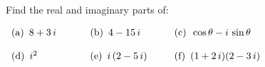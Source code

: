 Find the real and imaginary parts of:

$
\begin{array}[h!]{lll}
{\rm (a)}\hskip5pt 8+3\,i\hskip24pt&
{\rm (b)}\hskip5pt 4-15\,i\hskip24pt&
{\rm (c)}\hskip5pt \cos\theta-i\,\sin\theta\\
\noalign{\vskip12pt}
{\rm (d)}\hskip5pt i^2&
{\rm (e)}\hskip5pt i\,(2-5\,i)&
{\rm (f)}\hskip5pt (1+2\,i)(2-3\,i)
\end{array}
$